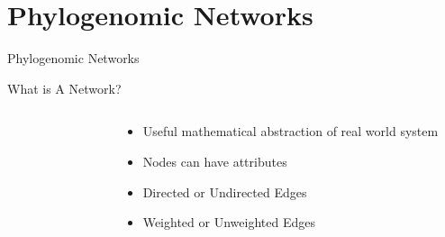 \documentclass[dvipsnames]{beamer}
\begin{document}
\section{Phylogenomic Networks}
\begin{frame}{}
    \begin{center}
        \Huge \textcolor{OliveGreen}{Phylogenomic Networks}
    \end{center}
    \addtocounter{framenumber}{-1}
\end{frame}
\begin{frame}[fragile]{What is A Network?}
\begin{columns}
    \begin{column}{0.5\textwidth}
        \begin{figure}[htb!]
        \end{figure}
        \autocite{bondy}
    \end{column}
    \begin{column}{0.5\textwidth}
        \begin{itemize}
            \item<2-> Useful mathematical abstraction of real world system
            \item<3-> Nodes can have attributes
            \item<4-> Directed or Undirected Edges
            \item<5-> Weighted or Unweighted Edges
        \end{itemize}
    \end{column}
\end{columns}
\end{frame}
\end{document}

